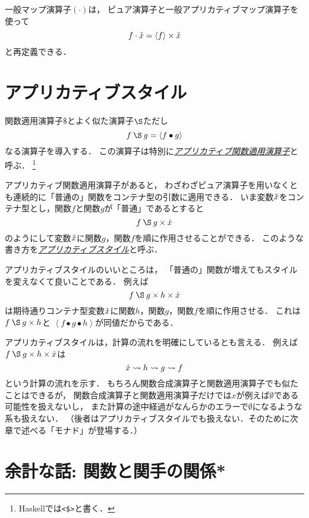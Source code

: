 \documentclass[a5paper,draft]{jsbook}
\newcommand{\programminglanguage}[1]{\textsf{#1}}
\newcommand{\haskell}{\programminglanguage{Haskell}}
\newcommand{\keyword}[1]{{\underline{\emph{#1}}}}
\newcommand{\code}[1]{\texttt{#1}}
\newcommand{\mathContainerVar}[1]{\Check{#1}}
\newcommand{\mathPureWith}[1]{\left\langle#1\right\rangle}
\newcommand{\mathNothing}{\emptyset}
\newcommand{\mathApplicativeApply}{\mathbin{\S}}
\newcommand{\mathApplicativeGeneralMap}{\mathbin{\times}}
\newcommand{\mathApply}{\mathbin{\$}}
\newcommand{\mathCompose}{\mathbin{\bullet}}
\newcommand{\mathGeneralMap}{\mathbin{\cdot}}
\begin{document}
一般マップ演算子$(\mathGeneralMap)$は，
ピュア演算子と一般アプリカティブマップ演算子を使って
$$
f\mathGeneralMap\mathContainerVar{x}=\mathPureWith{f}\mathApplicativeGeneralMap\mathContainerVar{x}
$$
と再定義できる．

\section{アプリカティブスタイル}

関数適用演算子$\mathApply$とよく似た演算子$\mathApplicativeApply$ただし
$$
f\mathApplicativeApply g=\mathPureWith{f\mathCompose g}
$$
なる演算子を導入する．
この演算子は特別に\keyword{アプリカティブ関数適用演算子}と呼ぶ．%
\footnote{\haskell では\code{<\$>}と書く．}

アプリカティブ関数適用演算子があると，
わざわざピュア演算子を用いなくとも連続的に「普通の」関数をコンテナ型の引数に適用できる．
いま変数$\mathContainerVar{x}$をコンテナ型とし，関数$f$と関数$g$が「普通」であるとすると
$$
f\mathApplicativeApply g\mathApplicativeGeneralMap\mathContainerVar{x}
$$
のようにして変数$\mathContainerVar{x}$に関数$g$，関数$f$を順に作用させることができる．
このような書き方を\keyword{アプリカティブスタイル}と呼ぶ．

アプリカティブスタイルのいいところは，
「普通の」関数が増えてもスタイルを変えなくて良いことである．
例えば
$$
f\mathApplicativeApply g\mathApplicativeGeneralMap h\mathApplicativeGeneralMap\mathContainerVar{x}
$$
は期待通りコンテナ型変数$\mathContainerVar{x}$に関数$h$，関数$g$，関数$f$を順に作用させる．
これは$f\mathApplicativeApply g\mathApplicativeGeneralMap h$と%
$\mathPureWith{f\mathCompose g\mathCompose h}$が同値だからである．

アプリカティブスタイルは，計算の流れを明確にしているとも言える．
例えば$f\mathApplicativeApply g\mathApplicativeGeneralMap h\mathApplicativeGeneralMap\mathContainerVar{x}$は
$$
\mathContainerVar{x}\leadsto h\leadsto g\leadsto f
$$
という計算の流れを示す．
もちろん関数合成演算子と関数適用演算子でも似たことはできるが，
関数合成演算子と関数適用演算子だけでは$x$が例えば$\mathNothing$である可能性を扱えないし，
また計算の途中経過がなんらかのエラーで$\mathNothing$になるような系も扱えない．
（後者はアプリカティブスタイルでも扱えない．そのために次章で述べる「モナド」が登場する．）

\section{余計な話: 関数と関手の関係*}
\end{document}
